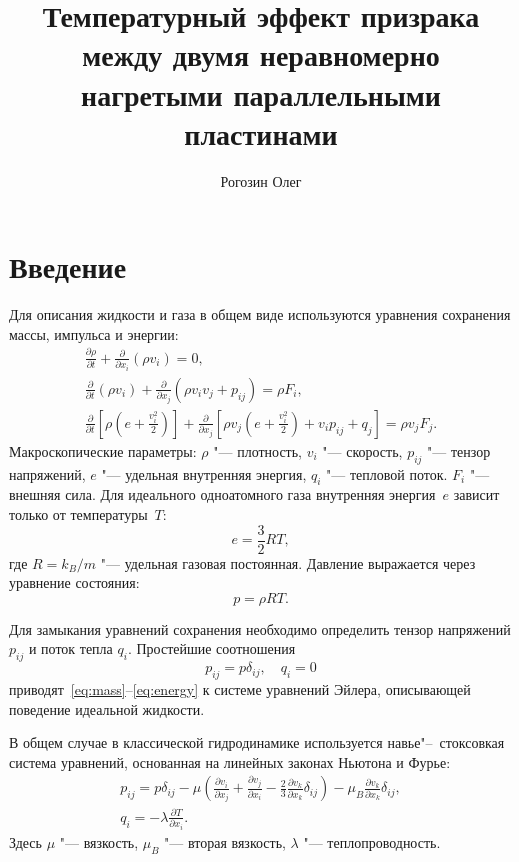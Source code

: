 \documentclass[english,russian,a4paper,12pt]{article}
\title{Температурный эффект призрака между двумя неравномерно нагретыми параллельными пластинами}
\author{Рогозин Олег}
\date{}
\newcommand{\pder}[2][]{\frac{\partial#1}{\partial#2}}
\begin{document}
\maketitle
\tableofcontents

\section{Введение}

Для описания жидкости и газа в общем виде используются уравнения сохранения массы, импульса и энергии:
\begin{gather}
	\pder[\rho]{t} + \pder{x_i}(\rho v_i) = 0, \label{eq:mass}\\
	\pder{t}(\rho v_i) + \pder{x_j}(\rho v_i v_j + p_{ij}) = \rho F_i, \label{eq:momentum}\\
	\pder{t}\left[\rho\left(e+\frac{v_i^2}2\right)\right] +
		\pder{x_j}\left[\rho v_j\left(e+\frac{v_i^2}2\right)+v_i p_{ij}+q_j\right] = \rho v_j F_j. \label{eq:energy}
\end{gather}
Макроскопические параметры: \(\rho\) "--- плотность, \(v_i\) "--- скорость, \(p_{ij}\) "--- тензор напряжений,
\(e\) "--- удельная внутренняя энергия, \(q_i\) "--- тепловой поток. \(F_i\) "--- внешняя сила.
Для идеального одноатомного газа внутренняя энергия~\(e\) зависит только от температуры~\(T\):
\[ e = \frac32RT,\]
где \(R=k_B/m\) "--- удельная газовая постоянная. Давление выражается через уравнение состояния:
\[ p = \rho RT. \]

Для замыкания уравнений сохранения необходимо определить 
тензор напряжений \(p_{ij}\) и поток тепла \(q_i\).
Простейшие соотношения
\begin{equation}
	p_{ij} = p\delta_{ij}, \quad q_i = 0
\end{equation}
приводят~\eqref{eq:mass}--\eqref{eq:energy} к системе уравнений Эйлера,
описывающей поведение идеальной жидкости.

В общем случае в классической гидродинамике используется навье"--~стоксовкая система уравнений,
основанная на линейных законах Ньютона и Фурье:
\begin{gather}
	p_{ij} = p\delta_{ij} - \mu\left(\pder[v_i]{x_j}+\pder[v_j]{x_i}-\frac23\pder[v_k]{x_k}\delta_{ij}\right) -
		\mu_B\pder[v_k]{x_k}\delta_{ij}, \label{eq:stress_tensor}\\
	q_i = -\lambda\pder[T]{x_i}. \label{eq:heat_flow}
\end{gather}
Здесь \(\mu\) "--- вязкость, \(\mu_B\) "--- вторая вязкость, \(\lambda\) "--- теплопроводность.
\end{document}
